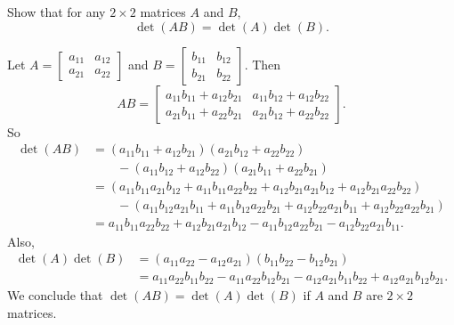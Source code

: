 \begin{example} Show that for any $2 \times 2$ matrices $A$ and $B$,
\[\det(AB) = \det(A) \det(B).\] 

\ExampleSolution

Let $A = \left[ \begin{array}{cc} a_{11}&a_{12} \\ a_{21}&a_{22} \end{array} \right]$ and $B = \left[ \begin{array}{cc} b_{11}&b_{12} \\ b_{21}&b_{22} \end{array} \right]$. Then
\[AB = \left[ \begin{array}{cc} a_{11}b_{11}+a_{12}b_{21}&a_{11}b_{12}+a_{12}b_{22} \\ a_{21}b_{11}+a_{22}b_{21}&a_{21}b_{12}+a_{22}b_{22} \end{array} \right].\]
So
\begin{align*}
\det(AB) &= (a_{11}b_{11}+a_{12}b_{21})(a_{21}b_{12}+a_{22}b_{22}) \\
	& \qquad   - (a_{11}b_{12}+a_{12}b_{22})(a_{21}b_{11}+a_{22}b_{21}) \\
	&= (a_{11}b_{11}a_{21}b_{12} + a_{11}b_{11}a_{22}b_{22} + a_{12}b_{21}a_{21}b_{12} + a_{12}b_{21}a_{22}b_{22}) \\
	& \qquad - (a_{11}b_{12}a_{21}b_{11} + a_{11}b_{12}a_{22}b_{21} +  a_{12}b_{22}a_{21}b_{11} + a_{12}b_{22}a_{22}b_{21}) \\ 
	&= a_{11}b_{11}a_{22}b_{22} + a_{12}b_{21}a_{21}b_{12} - a_{11}b_{12}a_{22}b_{21} - a_{12}b_{22}a_{21}b_{11}.
\end{align*}
Also,
\begin{align*}
\det(A) \det(B) &= (a_{11}a_{22}-a_{12}a_{21})(b_{11}b_{22}-b_{12}b_{21}) \\
	&= a_{11}a_{22}b_{11}b_{22} - a_{11}a_{22}b_{12}b_{21} - a_{12}a_{21}b_{11}b_{22} + a_{12}a_{21}b_{12}b_{21}.
\end{align*}
We conclude that $\det(AB) = \det(A) \det(B)$ if $A$ and $B$ are $2 \times 2$ matrices.

\end{example}

\label{sec:det_summ}

